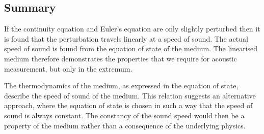 






\subsection{Summary}
If the continuity equation and Euler's equation are only slightly perturbed
then it is found that the perturbation travels linearly at a speed of sound.
The actual speed of sound is found from the equation of state of the medium.
The linearised medium therefore demonstrates the properties that we require for acoustic measurement,
but only in the extremum.

The thermodynamics of the medium, as expressed in the equation of state,
describe the speed of sound of the medium.
This relation suggests an alternative approach,
where the equation of state is chosen in such a way that the speed of sound is always constant.
The constancy of the sound speed would then be a property of the medium rather than a consequence of the underlying physics.


